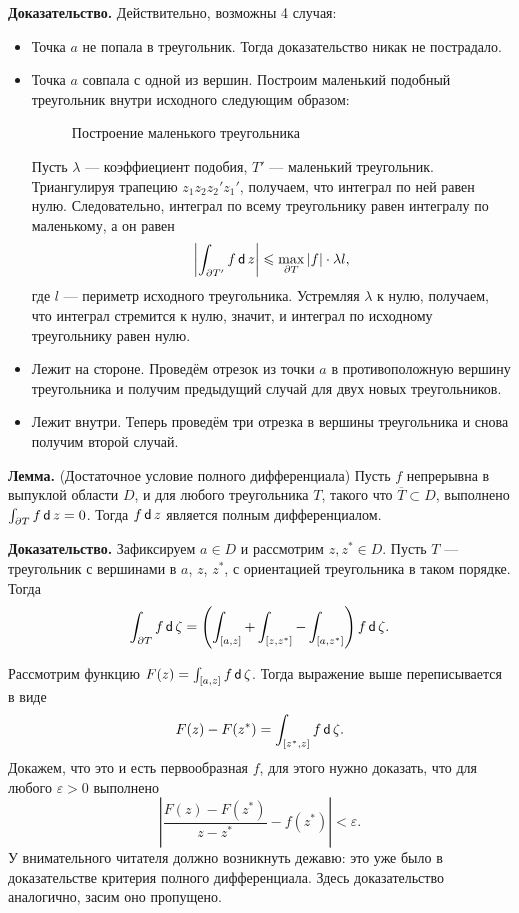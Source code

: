 \textbf{Доказательство.} Действительно, возможны 4 случая:
\begin{itemize}
    \item Точка $a$ не попала в треугольник. Тогда доказательство никак не пострадало.
    \item Точка $a$ совпала с одной из вершин.
        Построим маленький подобный треугольник внутри исходного следующим образом:

        \begin{figure}[ht]
            \centering
            \caption{Построение маленького треугольника}
        \end{figure}

        Пусть $\lambda$ --- коэффиециент подобия, $T'$ --- маленький треугольник.
        Триангулируя трапецию $z_1 z_2 z_2' z_1'$, получаем, что интеграл по ней равен нулю.
        Следовательно, интеграл по всему треугольнику равен интегралу по маленькому, а он равен
        \[
            \left| \int_{\partial T'} f \operatorname{\mathsf d} z \right| \leqslant \max_{\partial T} |f| \cdot \lambda l,
        \]
        где $l$ --- периметр исходного треугольника.
        Устремляя $\lambda$ к нулю, получаем, что интеграл стремится к нулю, значит, и интеграл по исходному треугольнику равен нулю.

    \item Лежит на стороне.
        Проведём отрезок из точки $a$ в противоположную вершину треугольника и получим предыдущий случай для двух новых треугольников.
    \item Лежит внутри. Теперь проведём три отрезка в вершины треугольника и снова получим второй случай.
\end{itemize}

\QED

\textbf{Лемма.} (Достаточное условие полного дифференциала) Пусть $f$ непрерывна в выпуклой области $D$, и для любого треугольника $T$, такого что $\overline T \subset D$, выполнено $\int_{\partial T} f \operatorname{\mathsf d} z = 0$.
Тогда $f \operatorname{\mathsf d} z$ является полным дифференциалом.

\textbf{Доказательство.} Зафиксируем $a \in D$ и рассмотрим $z, z^* \in D$.
Пусть $T$ --- треугольник с вершинами в $a$, $z$, $z^*$, с ориентацией треугольника в таком порядке.
Тогда
\[
    \int_{\partial T} f \operatorname{\mathsf d} \zeta = \left( \int_{[a, z]} + \int_{[z, z^*]} - \int_{[a, z^*]} \right) f \operatorname{\mathsf d} \zeta.
\]

Рассмотрим функцию $F(z) = \int_{[a, z]} f \operatorname{\mathsf d} \zeta$.
Тогда выражение выше переписывается в виде
\[
    F(z) - F(z^*) = \int_{[z^*, z]} f \operatorname{\mathsf d} \zeta.
\]
Докажем, что это и есть первообразная $f$, для этого нужно доказать, что для любого $\varepsilon > 0$ выполнено
\[
    \left| \frac{F(z) - F(z^*)}{z - z^*} - f(z^*) \right| < \varepsilon.
\]
У внимательного читателя должно возникнуть дежавю: это уже было в доказательстве критерия полного дифференциала.
Здесь доказательство аналогично, засим оно пропущено.

